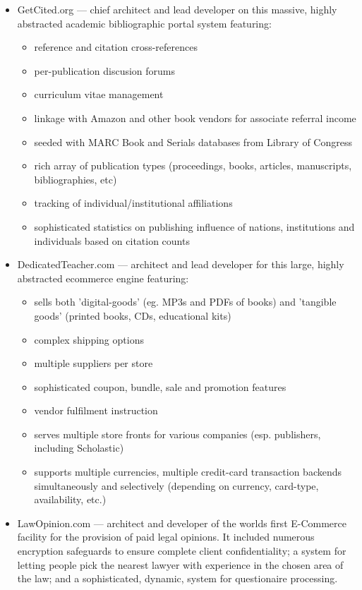 \begin{resume}
\begin{position}
\begin{itemize}
\item GetCited.org --- chief architect and lead developer on
  this massive, highly abstracted academic bibliographic portal system featuring:
  \begin{itemize}
    \item reference and citation cross-references
    \item per-publication discusion forums
    \item curriculum vitae management
    \item linkage with Amazon and other book vendors for associate
    referral income
    \item seeded with MARC Book and Serials databases from Library of Congress
    \item rich array of publication types (proceedings, books, articles,
       manuscripts, bibliographies, etc)
    \item tracking of individual/institutional affiliations
    \item sophisticated statistics on publishing influence of
       nations, institutions and individuals based on citation counts
  \end{itemize}    

\item DedicatedTeacher.com --- architect and lead developer
  for this large, highly abstracted ecommerce engine featuring:
    \begin{itemize}
      \item sells both 'digital-goods' (eg. MP3s and PDFs of books)
      and 'tangible goods' (printed books, CDs, educational kits)
      \item complex shipping options
      \item multiple suppliers per store
      \item sophisticated coupon, bundle, sale and promotion features
      \item vendor fulfilment instruction
      \item serves multiple store fronts for various companies
      (esp. publishers, including Scholastic)
      \item supports multiple currencies, multiple credit-card
      transaction backends simultaneously and selectively 
      (depending on currency, card-type, availability, etc.)
    \end{itemize}

\item LawOpinion.com --- architect and developer of the worlds
                        first E-Commerce facility for the provision of 
                        paid legal opinions.  
                        It included numerous encryption safeguards 
                        to ensure complete client confidentiality; a
                        system for letting people pick the nearest
                        lawyer with experience in the chosen area of
                        the law;  and a sophisticated, dynamic,
                        system for questionaire processing.


\end{itemize}
\end{position}
\end{resume}
